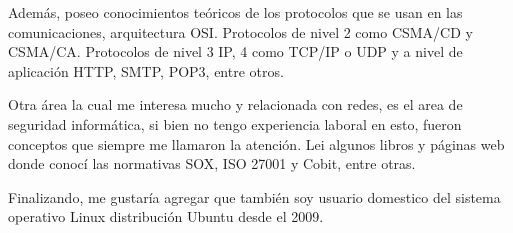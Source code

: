 Además, poseo conocimientos teóricos de los protocolos que se usan en las comunicaciones, arquitectura OSI. Protocolos de nivel 2 como CSMA/CD y CSMA/CA. Protocolos de nivel 3 IP, 4 como TCP/IP o UDP y a nivel de aplicación HTTP, SMTP, POP3, entre otros.

Otra área la cual me interesa mucho y relacionada con redes, es el area de seguridad informática, si bien no tengo
experiencia laboral en esto, fueron conceptos que siempre me llamaron la atención. Lei algunos libros y páginas
web donde conocí las normativas SOX, ISO 27001 y Cobit, entre otras.

Finalizando, me gustaría agregar que también soy usuario domestico del sistema operativo Linux distribución Ubuntu desde el 2009.
